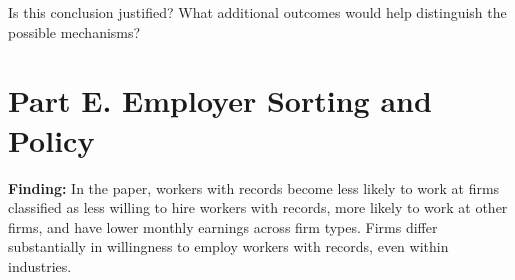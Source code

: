 \documentclass[11pt]{article}
\begin{document}
\begin{enumerate}[resume]
\begin{enumerate}[label=(\alph*)]
Is this conclusion justified? What additional outcomes
would help distinguish the possible mechanisms?
\vspace{2cm}

\end{enumerate}


\end{enumerate}

\section*{Part E. Employer Sorting and Policy}

\noindent\textbf{Finding:}
In the paper, workers with records become less likely to work
at firms classified as less willing to hire workers with records,
more likely to work at other firms, and have lower monthly earnings
across firm types.
Firms differ substantially in willingness to employ workers
with records, even within industries.
\end{document}
